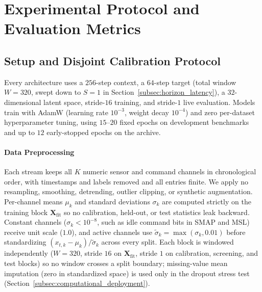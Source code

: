 \section{Experimental Protocol and Evaluation Metrics}
\label{sec:exp}

\subsection{Setup and Disjoint Calibration Protocol}
\label{subsec:exp_setup}
Every architecture uses a $256$-step context, a $64$-step target (total window $W=320$, swept down to $S=1$ in Section~\ref{subsec:horizon_latency}), a $32$-dimensional latent space, stride-$16$ training, and stride-$1$ live evaluation. Models train with AdamW \cite{loshchilov2017decoupled} (learning rate $10^{-3}$, weight decay $10^{-4}$) and zero per-dataset hyperparameter tuning, using $15\text{--}20$ fixed epochs on development benchmarks and up to $12$ early-stopped epochs on the archive.

\paragraph{Data Preprocessing}
Each stream keeps all $K$ numeric sensor and command channels in chronological order, with timestamps and labels removed and all entries finite. We apply no resampling, smoothing, detrending, outlier clipping, or synthetic augmentation. Per-channel means $\mu_k$ and standard deviations $\sigma_k$ are computed strictly on the training block $\mathbf{X}_{\text{fit}}$ so no calibration, held-out, or test statistics leak backward. Constant channels ($\sigma_k < 10^{-8}$, such as idle command bits in SMAP and MSL) receive unit scale ($1.0$), and active channels use $\tilde{\sigma}_k = \max(\sigma_k, 0.01)$ before standardizing $(x_{t,k}-\mu_k)/\tilde{\sigma}_k$ across every split. Each block is windowed independently ($W=320$, stride $16$ on $\mathbf{X}_{\text{fit}}$, stride $1$ on calibration, screening, and test blocks) so no window crosses a split boundary; missing-value mean imputation (zero in standardized space) is used only in the dropout stress test (Section~\ref{subsec:computational_deployment}).

